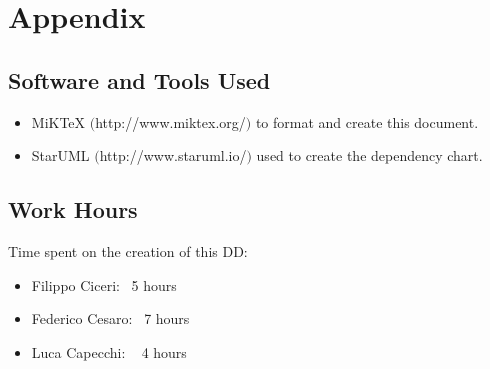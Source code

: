 \section{Appendix}

	\subsection{Software and Tools Used}
		\begin{itemize}
			\item MiKTeX $($http://www.miktex.org/$)$ to format and create this document.
			\item StarUML $($http://www.staruml.io/$)$ used to create the dependency chart.
		\end{itemize}

		\subsection{Work Hours}
			Time spent on the creation of this DD:
			\begin{itemize}
				\item Filippo Ciceri: ~5 hours
				\item Federico Cesaro: ~7 hours
				\item Luca Capecchi: ~ 4 hours
			\end{itemize}